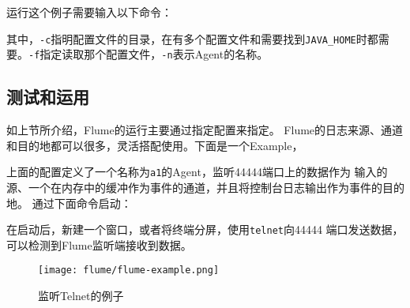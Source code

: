 运行这个例子需要输入以下命令：



其中，\lstinline{-c}指明配置文件的目录，在有多个配置文件和需要找到\lstinline{JAVA_HOME}时都需要。\lstinline{-f}指定读取那个配置文件，\lstinline{-n}表示Agent的名称。

\subsection{测试和运用}

如上节所介绍，Flume的运行主要通过指定配置来指定。
Flume的日志来源、通道和目的地都可以很多，灵活搭配使用。下面是一个Example，



上面的配置定义了一个名称为\lstinline{a1}的Agent，监听44444端口上的数据作为
输入的源、一个在内存中的缓冲作为事件的通道，并且将控制台日志输出作为事件的目的地。
通过下面命令启动：



在启动后，新建一个窗口，或者将终端分屏，使用\lstinline{telnet}向44444
端口发送数据，可以检测到Flume监听端接收到数据。

\begin{figure}[h]
	\centering
	\texttt{[image: flume/flume-example.png]}
	\caption{监听Telnet的例子}
	\label{fig:flume_example}
\end{figure}
